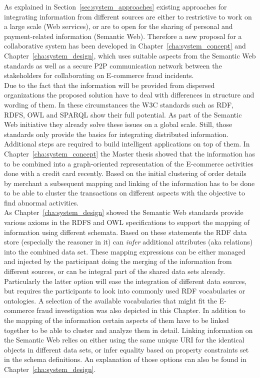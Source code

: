 As explained in Section~\ref{sec:system_approaches} existing approaches for integrating information from different sources are either to restrictive to work on a large scale (Web services), or are to open for the sharing of personal and payment-related information (Semantic Web). Therefore a new proposal for a collaborative system has been developed in Chapter~\ref{cha:system_concept} and Chapter~\ref{cha:system_design}, which uses suitable aspects from the Semantic Web standards as well as a secure \gls{P2P} communication network between the stakeholders for collaborating on \gls{E-commerce} fraud incidents. \\

Due to the fact that the information will be provided from dispersed organizations the proposed solution have to deal with differences in structure and wording of them. In these circumstances the \gls{W3C} standards such as \gls{RDF}, \gls{RDFS}, \gls{OWL} and \gls{SPARQL} show their full potential. As part of the Semantic Web initiative they already solve these issues on a global scale. Still, those standards only provide the basics for integrating distributed information. Additional steps are required to build intelligent applications on top of them. In Chapter~\ref{cha:system_concept} the Master thesis showed that the information has to be combined into a graph-oriented representation of the \gls{E-commerce} activities done with a credit card recently. Based on the initial clustering of order details by merchant a subsequent mapping and linking of the information has to be done to be able to cluster the transactions on different aspects with the objective to find abnormal activities. \\

As Chapter~\ref{cha:system_design} showed the Semantic Web standards provide various axioms in the \gls{RDFS} and \gls{OWL} specifications to support the mapping of information using different schemata. Based on these statements the \gls{RDF} data store (especially the reasoner in it) can \emph{infer} additional attributes (aka relations) into the combined data set. These mapping expressions can be either managed and injected by the participant doing the merging of the information from different sources, or can be integral part of the shared data sets already. Particularly the latter option will ease the integration of different data sources, but requires the participants to look into commonly used \gls{RDF} vocabularies or ontologies. A selection of the available vocabularies that might fit the \gls{E-commerce} fraud investigation was also depicted in this Chapter. In addition to the mapping of the information certain aspects of them have to be linked together to be able to cluster and analyze them in detail. Linking information on the Semantic Web relies on either using the same unique \gls{URI} for the identical objects in different data sets, or infer equality based on property constraints set in the schema definitions. An explanation of those options can also be found in Chapter~\ref{cha:system_design}. \\

